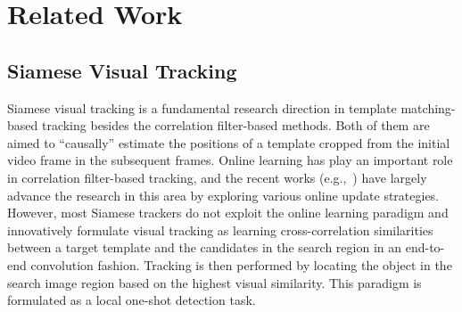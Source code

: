 \documentclass[journal]{IEEEtran}
\newcommand{\eg}{e.g.}
\begin{document}

\section{Related Work}

\subsection{Siamese Visual Tracking}

Siamese visual tracking is a fundamental research direction in template matching-based tracking besides the correlation filter-based methods. Both of them are aimed to ``causally'' estimate the positions of a template cropped from the initial video frame in the subsequent frames. Online learning has play an important role in correlation filter-based tracking, and the recent works (\eg,~\cite{AutoTrack, 9376997, 9132673}) have largely advance the research in this area by exploring various online update strategies.
However, most Siamese trackers do not exploit the online learning paradigm and innovatively formulate visual tracking as learning cross-correlation similarities between a target template and the candidates in the search region in an end-to-end convolution fashion. Tracking is then performed by locating the object in the search image region based on the highest visual similarity. This paradigm is formulated as a local one-shot detection task.
\end{document}
